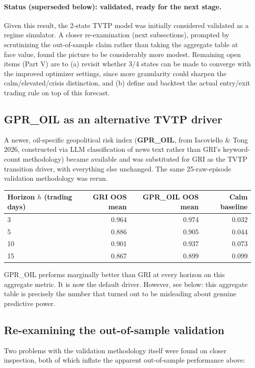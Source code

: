 \documentclass[11pt]{article}
\begin{document}
\paragraph{Status (superseded below): validated, ready for the next stage.}
Given this result, the 2-state TVTP model was initially considered
validated as a regime simulator. A closer re-examination (next
subsections), prompted by scrutinizing the out-of-sample claim rather than
taking the aggregate table at face value, found the picture to be
considerably more modest. Remaining open items (Part V) are to (a) revisit
whether 3/4 states can be made to converge with the improved optimizer
settings, since more granularity could sharpen the calm/elevated/crisis
distinction, and (b) define and backtest the actual entry/exit trading rule
on top of this forecast.

\subsection{GPR\_OIL as an alternative TVTP driver}
A newer, oil-specific geopolitical risk index (\textbf{GPR\_OIL}, from
Iacoviello \& Tong 2026, constructed via LLM classification of news text
rather than GRI's keyword-count methodology) became available and was
substituted for GRI as the TVTP transition driver, with everything else
unchanged. The same 25-raw-episode validation methodology was rerun.

\begin{center}
\begin{tabular}{lrrr}
\toprule
Horizon $h$ (trading days) & GRI OOS mean & GPR\_OIL OOS mean & Calm baseline \\
\midrule
3  & 0.964 & 0.974 & 0.032 \\
5  & 0.886 & 0.905 & 0.044 \\
10 & 0.901 & 0.937 & 0.073 \\
15 & 0.867 & 0.899 & 0.099 \\
\bottomrule
\end{tabular}
\end{center}

GPR\_OIL performs marginally better than GRI at every horizon on this
aggregate metric. It is now the default driver. However, see below: this
aggregate table is precisely the number that turned out to be misleading
about genuine predictive power.

\subsection{Re-examining the out-of-sample validation}
Two problems with the validation methodology itself were found on closer
inspection, both of which inflate the apparent out-of-sample performance
above:
\end{document}
